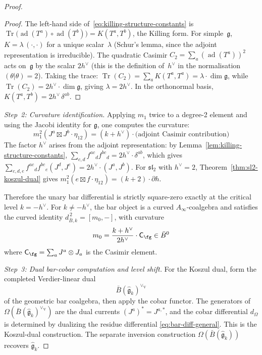 \begin{proof}
\begin{proof}
The left-hand side of~\eqref{eq:killing-structure-constants}
is $\operatorname{Tr}\bigl(\operatorname{ad}(T^a) \circ
\operatorname{ad}(T^b)\bigr) = K(T^a, T^b)$,
the Killing form.
For simple~$\mathfrak{g}$, $K = \lambda\,(\cdot,\cdot)$
for a unique scalar~$\lambda$ (Schur's lemma, since the
adjoint representation is irreducible).
The quadratic Casimir $C_2 = \sum_a
(\operatorname{ad}(T^a))^2$ acts on~$\mathfrak{g}$
by the scalar $2h^\vee$ (this is the definition of~$h^\vee$
in the normalisation $(\theta|\theta) = 2$).
Taking the trace: $\operatorname{Tr}(C_2) = \sum_a
K(T^a, T^a) = \lambda \cdot \dim\mathfrak{g}$,
while $\operatorname{Tr}(C_2) = 2h^\vee \cdot
\dim\mathfrak{g}$, giving $\lambda = 2h^\vee$.
In the orthonormal basis, $K(T^a, T^b)
= 2h^\vee\,\delta^{ab}$.
\end{proof}

\emph{Step~2: Curvature identification.}
Applying $m_1$ twice to a degree-2 element and using the Jacobi identity for $\mathfrak{g}$, one computes the curvature:
\begin{equation}\label{eq:d-squared-general}
m_1^2(J^a \boxtimes J^b \cdot \eta_{12}) = (k + h^\vee) \cdot \bigl(\text{adjoint Casimir contribution}\bigr)
\end{equation}
The factor $h^\vee$ arises from the adjoint representation: by Lemma~\ref{lem:killing-structure-constants}, $\sum_{c,d} f^{ac}{}_d f^{bc}{}_d = 2h^\vee \cdot \delta^{ab}$, which gives $\sum_{c,d,e} f^{ac}{}_d f^{bc}{}_e (J^d, J^e) = 2h^\vee \cdot (J^a, J^b)$. For $\mathfrak{sl}_2$ with $h^\vee = 2$, Theorem~\ref{thm:sl2-koszul-dual} gives $m_1^2(e \boxtimes f \cdot \eta_{12}) = (k+2) \cdot \partial h$.

Therefore the unary bar differential is strictly square-zero exactly
at the critical level $k=-h^\vee$. For $k \neq -h^\vee$, the bar
object is a curved $A_\infty$-coalgebra and satisfies the curved
identity $d_{\bar B,k}^{\,2}=[m_0,-]$, with curvature
\begin{equation}
m_0 =
\frac{k + h^\vee}{2h^\vee} \cdot \mathsf C_{\fg}
\in \bar{B}^0
\end{equation}
where $\mathsf C_{\fg} = \sum_a J^a \otimes J_a$ is the Casimir
element.

\emph{Step~3: Dual bar-cobar computation and level shift.}
For the Koszul dual, form the completed Verdier-linear dual
\[
\bar B(\widehat{\mathfrak g}_k)^{\vee_{\mathrm V}}
\]
of the geometric bar coalgebra, then apply the cobar functor.  The
generators of
\(\Omega(\bar B(\widehat{\mathfrak g}_k)^{\vee_{\mathrm V}})\)
are the dual currents $(J^a)^* = J^{a,*}$, and the cobar differential
$d_\Omega$ is determined by dualizing the residue differential
\eqref{eq:bar-diff-general}.  This is the Koszul-dual construction.
The separate inversion construction
\(\Omega(\bar B(\widehat{\mathfrak g}_k))\) recovers
\(\widehat{\mathfrak g}_k\).


\end{proof}
